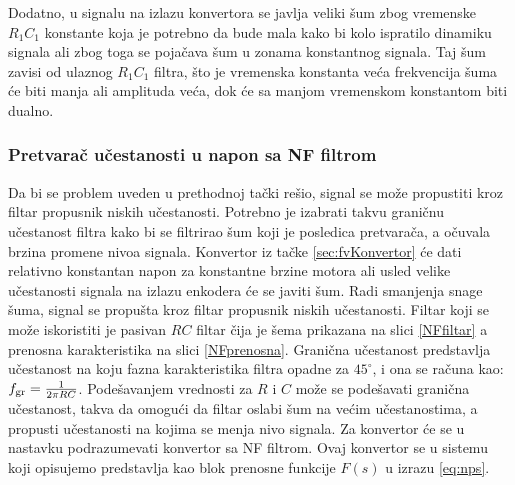 \documentclass[a4paper, 12pt, diplomski]{etf}
\begin{document}
Dodatno, u signalu na izlazu konvertora se javlja veliki šum zbog vremenske $R_1C_1$ konstante koja je potrebno da bude mala kako bi kolo ispratilo dinamiku signala ali zbog toga se pojačava šum u zonama konstantnog signala. Taj šum zavisi od ulaznog $R_1C_1$ filtra, što je vremenska konstanta veća frekvencija šuma će biti manja ali amplituda veća, dok će sa manjom vremenskom konstantom biti dualno.

\subsubsection{Pretvarač učestanosti u napon sa NF filtrom} \label{s:FVNF}

Da bi se problem uveden u prethodnoj tački rešio, signal se može propustiti kroz filtar propusnik niskih učestanosti. Potrebno je izabrati takvu graničnu učestanost filtra kako bi se filtrirao šum koji je posledica pretvarača, a očuvala brzina promene nivoa signala. 
Konvertor iz tačke \ref{sec:fvKonvertor} će dati relativno konstantan napon za konstantne brzine motora ali usled velike učestanosti signala na izlazu enkodera će se javiti šum. Radi smanjenja snage šuma, signal se propušta kroz filtar propusnik niskih učestanosti.
Filtar koji se može iskoristiti je pasivan $RC$ filtar čija je šema prikazana na slici \ref{NFfiltar} a prenosna karakteristika na slici \ref{NFprenosna}. Granična učestanost predstavlja učestanost na koju fazna karakteristika filtra opadne za $45^{\circ}$, i ona se računa kao: $f_{\rm{gr}} = \frac{1}{2 \pi RC}$. Podešavanjem vrednosti za $R$ i $C$ može se podešavati granična učestanost, takva da omogući da filtar oslabi šum na većim učestanostima, a propusti učestanosti na kojima se menja nivo signala. Za konvertor će se u nastavku podrazumevati konvertor sa NF filtrom.
Ovaj konvertor se u sistemu koji opisujemo predstavlja kao blok prenosne funkcije $F(s)$ u izrazu \eqref{eq:nps}.
\end{document}
